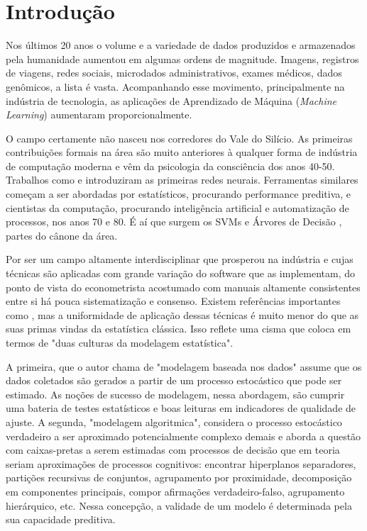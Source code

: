 

\chapter{Introdução}
\label{cap:intro} %



Nos últimos 20 anos o volume e a variedade de dados produzidos e armazenados pela humanidade aumentou em algumas ordens de magnitude.  Imagens, registros de viagens, redes sociais, microdados administrativos, exames médicos, dados genômicos, a lista é vasta. Acompanhando esse movimento, principalmente na indústria de tecnologia, as aplicações de Aprendizado de Máquina (\textit{Machine Learning}) aumentaram proporcionalmente.

O campo certamente não nasceu nos corredores do Vale do Silício. As primeiras contribuições formais na área são muito anteriores à qualquer forma de indústria de computação moderna e vêm da psicologia da consciência dos anos 40-50. Trabalhos como  e  introduziram as primeiras redes neurais. Ferramentas similares começam a ser abordadas por estatísticos, procurando performance preditiva, e cientistas da computação, procurando inteligência artificial e automatização de processos, nos anos 70 e 80. É aí que surgem os SVMs \cite{vapnik1974theory} e Árvores de Decisão \cite{breiman1984classification}, partes do cânone da área.

Por ser um campo altamente interdisciplinar que prosperou na indústria e cujas técnicas são aplicadas com grande variação do software que as implementam, do ponto de vista do econometrista acostumado com manuais altamente consistentes entre si há pouca sistematização e consenso. Existem referências importantes como , mas a uniformidade de aplicação dessas técnicas é muito menor do que as suas primas vindas da estatística clássica. Isso reflete uma cisma que  coloca em termos de "duas culturas da modelagem estatística". 

A primeira, que o autor chama de "modelagem baseada nos dados" assume que os dados coletados são gerados a partir de um processo estocástico que pode ser estimado. As noções de sucesso de modelagem, nessa abordagem, são cumprir uma bateria de testes estatísticos e boas leituras em indicadores de qualidade de ajuste. A segunda, "modelagem algoritmica", considera o processo estocástico verdadeiro a ser aproximado potencialmente complexo demais e aborda a questão com caixas-pretas a serem estimadas com processos de decisão que em teoria seriam aproximações de processos cognitivos: encontrar hiperplanos separadores, partições recursivas de conjuntos, agrupamento por proximidade, decomposição em componentes principais, compor afirmações verdadeiro-falso, agrupamento hierárquico, etc. Nessa concepção, a validade de um modelo é determinada pela sua capacidade preditiva. 


